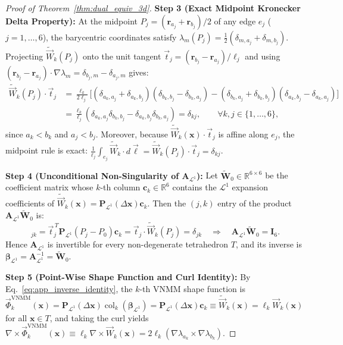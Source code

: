 \documentclass[preprint,12pt]{elsarticle}
\newcommand{\curl}{\nabla \times}
\newcommand{\R}{\mathbb{R}}
\begin{document}
\begin{proof}[Proof of Theorem~\ref{thm:dual_equiv_3d}]
\textbf{Step 3 (Exact Midpoint Kronecker Delta Property):} At the midpoint $P_j = (\mathbf{r}_{a_j} + \mathbf{r}_{b_j})/2$ of any edge $e_j$ ($j=1,\dots,6$), the barycentric coordinates satisfy $\lambda_m(P_j) = \frac{1}{2}(\delta_{m,a_j} + \delta_{m,b_j})$. Projecting $\widetilde{\vec{W}}_k(P_j)$ onto the unit tangent $\vec{t}_j = (\mathbf{r}_{b_j} - \mathbf{r}_{a_j})/\ell_j$ and using $(\mathbf{r}_{b_j} - \mathbf{r}_{a_j})\cdot\nabla\lambda_m = \delta_{b_j,m} - \delta_{a_j,m}$ gives:
\begin{align}
    \widetilde{\vec{W}}_k(P_j) \cdot \vec{t}_j &= \frac{\ell_k}{2\ell_j} \Big[ (\delta_{a_k,a_j} + \delta_{a_k,b_j})(\delta_{b_k,b_j} - \delta_{b_k,a_j}) - (\delta_{b_k,a_j} + \delta_{b_k,b_j})(\delta_{a_k,b_j} - \delta_{a_k,a_j}) \Big] \nonumber \\
    &= \frac{\ell_k}{\ell_j}(\delta_{a_k,a_j}\delta_{b_k,b_j} - \delta_{a_k,b_j}\delta_{b_k,a_j}) = \delta_{kj}, \qquad \forall k,j \in \{1,\dots,6\},
    \label{eq:app_kronecker_midpoint}
\end{align}
since $a_k < b_k$ and $a_j < b_j$. Moreover, because $\widetilde{\vec{W}}_k(\mathbf{x})\cdot\vec{t}_j$ is affine along $e_j$, the midpoint rule is exact: $\frac{1}{\ell_j}\int_{e_j} \widetilde{\vec{W}}_k\cdot d\vec{\ell} = \widetilde{\vec{W}}_k(P_j)\cdot\vec{t}_j = \delta_{kj}$.

\textbf{Step 4 (Unconditional Non-Singularity of $\mathbf{A}_{\mathcal{L}^1}$):} Let $\widetilde{\mathbf{W}}_0 \in \R^{6\times 6}$ be the coefficient matrix whose $k$-th column $\mathbf{c}_k \in \R^6$ contains the $\mathcal{L}^1$ expansion coefficients of $\widetilde{\vec{W}}_k(\mathbf{x}) = \mathbf{P}_{\mathcal{L}^1}(\Delta\mathbf{x})\mathbf{c}_k$. Then the $(j,k)$ entry of the product $\mathbf{A}_{\mathcal{L}^1}\widetilde{\mathbf{W}}_0$ is:
\begin{equation}
    [\mathbf{A}_{\mathcal{L}^1}\widetilde{\mathbf{W}}_0]_{jk} = \vec{t}_j^{\,T} \mathbf{P}_{\mathcal{L}^1}(P_j - P_0)\mathbf{c}_k = \vec{t}_j \cdot \widetilde{\vec{W}}_k(P_j) = \delta_{jk} \quad \Longrightarrow \quad \mathbf{A}_{\mathcal{L}^1}\widetilde{\mathbf{W}}_0 = \mathbf{I}_6.
    \label{eq:app_inverse_identity}
\end{equation}
Hence $\mathbf{A}_{\mathcal{L}^1}$ is invertible for every non-degenerate tetrahedron $T$, and its inverse is $\bm{\beta}_{\mathcal{L}^1} = \mathbf{A}_{\mathcal{L}^1}^{-1} = \widetilde{\mathbf{W}}_0$.

\textbf{Step 5 (Point-Wise Shape Function and Curl Identity):} By Eq.~\eqref{eq:app_inverse_identity}, the $k$-th VNMM shape function is $\vec{\Phi}_k^{\text{VNMM}}(\mathbf{x}) = \mathbf{P}_{\mathcal{L}^1}(\Delta\mathbf{x})\operatorname{col}_k(\bm{\beta}_{\mathcal{L}^1}) = \mathbf{P}_{\mathcal{L}^1}(\Delta\mathbf{x})\mathbf{c}_k \equiv \widetilde{\vec{W}}_k(\mathbf{x}) = \ell_k \vec{W}_k(\mathbf{x})$ for all $\mathbf{x} \in T$, and taking the curl yields $\curl\vec{\Phi}_k^{\text{VNMM}}(\mathbf{x}) \equiv \ell_k \curl\vec{W}_k(\mathbf{x}) = 2\ell_k(\nabla\lambda_{a_k}\times\nabla\lambda_{b_k})$.
\end{proof}
\end{document}
